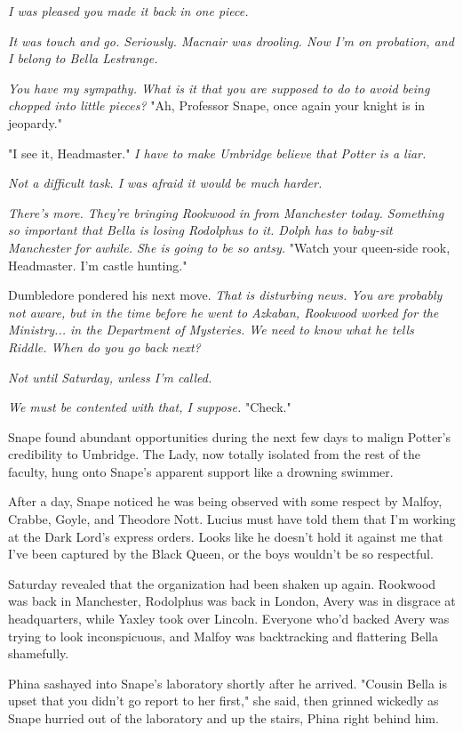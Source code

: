 \documentclass[a4paper,11pt]{article}
\begin{document}
\emph{I was pleased you made it back in one piece.}

\emph{It was touch and go. Seriously. Macnair was drooling. Now I'm on probation, and I belong to Bella Lestrange.}

\emph{You have my sympathy. What is it that you are supposed to do to avoid being chopped into little pieces?} "Ah, Professor Snape, once again your knight is in jeopardy."

"I see it, Headmaster." \emph{I have to make Umbridge believe that Potter is a liar.}

\emph{Not a difficult task. I was afraid it would be much harder.}

\emph{There's more. They're bringing Rookwood in from Manchester today. Something so important that Bella is losing Rodolphus to it. Dolph has to baby-sit Manchester for awhile. She is going to be so antsy.} "Watch your queen-side rook, Headmaster. I'm castle hunting."

Dumbledore pondered his next move. \emph{That is disturbing news. You are probably not aware, but in the time before he went to Azkaban, Rookwood worked for the Ministry... in the Department of Mysteries. We need to know what he tells Riddle. When do you go back next?}

\emph{Not until Saturday, unless I'm called.}

\emph{We must be contented with that, I suppose.} "Check."

Snape found abundant opportunities during the next few days to malign Potter's credibility to Umbridge. The Lady, now totally isolated from the rest of the faculty, hung onto Snape's apparent support like a drowning swimmer.

After a day, Snape noticed he was being observed with some respect by Malfoy, Crabbe, Goyle, and Theodore Nott. Lucius must have told them that I'm working at the Dark Lord's express orders. Looks like he doesn't hold it against me that I've been captured by the Black Queen, or the boys wouldn't be so respectful.

Saturday revealed that the organization had been shaken up again. Rookwood was back in Manchester, Rodolphus was back in London, Avery was in disgrace at headquarters, while Yaxley took over Lincoln. Everyone who'd backed Avery was trying to look inconspicuous, and Malfoy was backtracking and flattering Bella shamefully.

Phina sashayed into Snape's laboratory shortly after he arrived. "Cousin Bella is upset that you didn't go report to her first," she said, then grinned wickedly as Snape hurried out of the laboratory and up the stairs, Phina right behind him.
\end{document}
